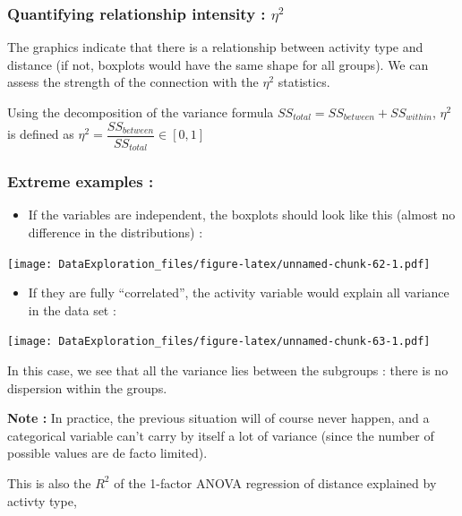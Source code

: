 \documentclass[
]{book}
\providecommand{\tightlist}{%
  \setlength{\itemsep}{0pt}\setlength{\parskip}{0pt}}
\begin{document}
\hypertarget{quantifying-relationship-intensity-eta2}{%
\subsubsection{\texorpdfstring{Quantifying relationship intensity : \(\eta^2\)}{Quantifying relationship intensity : \textbackslash eta\^{}2}}\label{quantifying-relationship-intensity-eta2}}

The graphics indicate that there is a relationship between activity type and distance (if not, boxplots would have the same shape for all groups). We can assess the strength of the connection with the \(\eta^2\) statistics.

Using the decomposition of the variance formula \(SS_{total} = SS_{between} + SS_{within}\), \(\eta^2\) is defined as \(\eta^2 = \dfrac{SS_{between}}{SS_{total}} \in [0,1]\)

\hypertarget{extreme-examples-1}{%
\subsubsection{Extreme examples :}\label{extreme-examples-1}}

\begin{itemize}
\tightlist
\item
  If the variables are independent, the boxplots should look like this (almost no difference in the distributions) :
\end{itemize}

\texttt{[image: DataExploration\_files/figure-latex/unnamed-chunk-62-1.pdf]}

\begin{itemize}
\tightlist
\item
  If they are fully ``correlated'', the activity variable would explain all variance in the data set :
\end{itemize}

\texttt{[image: DataExploration\_files/figure-latex/unnamed-chunk-63-1.pdf]}

In this case, we see that all the variance lies between the subgroups : there is no dispersion within the groups.

\textbf{Note :} In practice, the previous situation will of course never happen, and a categorical variable can't carry by itself a lot of variance (since the number of possible values are de facto limited).

This is also the \(R^2\) of the 1-factor ANOVA regression of distance explained by activty type,
\end{document}
